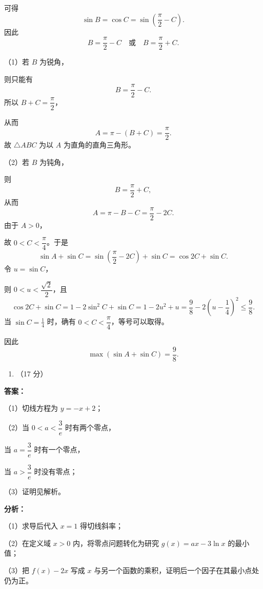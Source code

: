 \documentclass[UTF8,11pt,a4paper]{ctexart}
\providecommand{\tightlist}{%
  \setlength{\itemsep}{0pt}\setlength{\parskip}{0pt}}
\begin{document}
可得
\[
   \sin B=\cos C=\sin\left(\dfrac{\pi}{2}-C\right).
   \]
因此
\[
   B=\dfrac{\pi}{2}-C
   \quad\text{或}\quad
   B=\dfrac{\pi}{2}+C.
   \]


\par\smallskip\noindent（1）若 \(B\) 为锐角，

则只能有
\[
   B=\dfrac{\pi}{2}-C.
   \]
所以 \(B+C=\dfrac{\pi}{2}\)，

从而
\[
   A=\pi-(B+C)=\dfrac{\pi}{2}.
   \]
故 \(\triangle ABC\) 为以 \(A\) 为直角的直角三角形。


\par\smallskip\noindent（2）若 \(B\) 为钝角，

则
\[
   B=\dfrac{\pi}{2}+C,
   \]
从而
\[
   A=\pi-B-C=\dfrac{\pi}{2}-2C.
   \]
由于 \(A>0\)，

故 \(0<C<\dfrac{\pi}{4}\)。于是
\[
   \sin A+\sin C
   =\sin\left(\dfrac{\pi}{2}-2C\right)+\sin C
   =\cos 2C+\sin C.
   \]
令 \(u=\sin C\)，

则 \(0<u<\dfrac{\sqrt2}{2}\)，且
\[
   \cos 2C+\sin C
   =1-2\sin^2C+\sin C
   =1-2u^2+u
   =\frac98-2\left(u-\frac14\right)^2
   \leqslant \frac98.
   \]
当 \(\sin C=\frac14\) 时，确有 \(0<C<\dfrac{\pi}{4}\)，等号可以取得。

因此
\[
   \boxed{\max(\sin A+\sin C)=\frac98}.
   \]

\begin{enumerate}
\def\labelenumi{\arabic{enumi}.}
\setcounter{enumi}{17}
\tightlist
\item
  （17 分）
\end{enumerate}

\textbf{答案：}
\par\smallskip\noindent（1）切线方程为 \(y=-x+2\)；


\par\smallskip\noindent（2）当 \(0<a<\dfrac3e\) 时有两个零点，

当 \(a=\dfrac3e\) 时有一个零点，

当 \(a>\dfrac3e\) 时没有零点；


\par\smallskip\noindent（3）证明见解析。

\textbf{分析：}


\par\smallskip\noindent（1）求导后代入 \(x=1\) 得切线斜率；
\par\smallskip\noindent（2）在定义域 \(x>0\) 内，将零点问题转化为研究 \(g(x)=ax-3\ln x\) 的最小值；
\par\smallskip\noindent（3）把 \(f(x)-2x\) 写成 \(x\) 与另一个函数的乘积，证明后一个因子在其最小点处仍为正。
\end{document}
